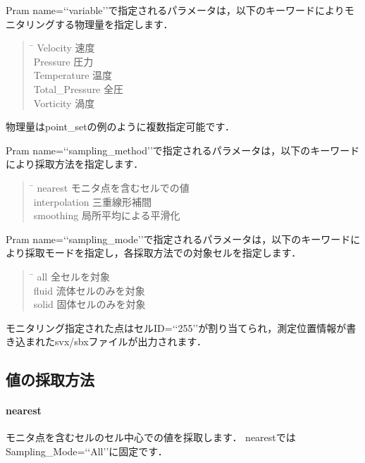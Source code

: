 Pram name=\lq\lq variable\rq\rq で指定されるパラメータは，以下のキーワードによりモニタリングする物理量を指定します．

\begin{quote}
\begin{tabbing}
\hspace{8em}\= \hspace{20em}\kill
Velocity \>  速度\\
Pressure \> 圧力\\
Temperature \> 温度\\
Total\_Pressure \>  全圧\\
Vorticity \>  渦度
\end{tabbing}
\end{quote}
物理量はpoint\_setの例のように複数指定可能です．

Pram name=\lq\lq sampling\_method\rq\rq で指定されるパラメータは，以下のキーワードにより採取方法を指定します．
\begin{quote}
\begin{tabbing}
\hspace{8em}\= \hspace{20em}\kill
nearest \> モニタ点を含むセルでの値 \\
interpolation \> 三重線形補間\\
smoothing \> 局所平均による平滑化
\end{tabbing}
\end{quote}
Pram name=\lq\lq sampling\_mode\rq\rq で指定されるパラメータは，以下のキーワードにより採取モードを指定し，各採取方法での対象セルを指定します．
\begin{quote}
\begin{tabbing}
\hspace{8em}\= \hspace{20em}\kill
all \> 全セルを対象\\
fluid \> 流体セルのみを対象\\
solid \> 固体セルのみを対象
\end{tabbing}
\end{quote}

モニタリング指定された点はセルID=\lq\lq 255\rq\rq が割り当てられ，測定位置情報が書き込まれたsvx/sbxファイルが出力されます．

\subsection{値の採取方法}
\paragraph{nearest}
モニタ点を含むセルのセル中心での値を採取します．
nearestではSampling\_Mode=\lq\lq All\rq\rq に固定です．

